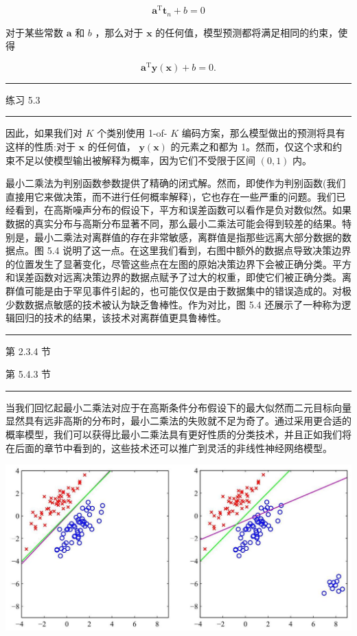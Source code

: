 \documentclass[10pt]{article}
\newcommand{\HRule}{\begin{center}\rule{0.9\linewidth}{0.2mm}\end{center}}
\begin{document}
\[
{\mathbf{a}}^{\mathrm{T}}{\mathbf{t}}_{n} + b = 0 \tag{5.17}
\]

对于某些常数 \(\mathbf{a}\) 和 \(b\) ，那么对于 \(\mathbf{x}\) 的任何值，模型预测都将满足相同的约束，使得

\[
{\mathbf{a}}^{\mathrm{T}}\mathbf{y}\left( \mathbf{x}\right)  + b = 0. \tag{5.18}
\]

\HRule

练习 5.3

\HRule

因此，如果我们对 \(K\) 个类别使用 1-of- \(K\) 编码方案，那么模型做出的预测将具有这样的性质:对于 \(\mathbf{x}\) 的任何值， \(\mathbf{y}\left( \mathbf{x}\right)\) 的元素之和都为 1。然而，仅这个求和约束不足以使模型输出被解释为概率，因为它们不受限于区间 \(\left( {0,1}\right)\) 内。

最小二乘法为判别函数参数提供了精确的闭式解。然而，即使作为判别函数(我们直接用它来做决策，而不进行任何概率解释)，它也存在一些严重的问题。我们已经看到，在高斯噪声分布的假设下，平方和误差函数可以看作是负对数似然。如果数据的真实分布与高斯分布显著不同，那么最小二乘法可能会得到较差的结果。特别是，最小二乘法对离群值的存在非常敏感，离群值是指那些远离大部分数据的数据点。图 5.4 说明了这一点。在这里我们看到，右图中额外的数据点导致决策边界的位置发生了显著变化，尽管这些点在左图的原始决策边界下会被正确分类。平方和误差函数对远离决策边界的数据点赋予了过大的权重，即使它们被正确分类。离群值可能是由于罕见事件引起的，也可能仅仅是由于数据集中的错误造成的。对极少数数据点敏感的技术被认为缺乏鲁棒性。作为对比，图 5.4 还展示了一种称为逻辑回归的技术的结果，该技术对离群值更具鲁棒性。

\HRule

第 2.3.4 节

第 5.4.3 节

\HRule

当我们回忆起最小二乘法对应于在高斯条件分布假设下的最大似然而二元目标向量显然具有远非高斯的分布时，最小二乘法的失败就不足为奇了。通过采用更合适的概率模型，我们可以获得比最小二乘法具有更好性质的分类技术，并且正如我们将在后面的章节中看到的，这些技术还可以推广到灵活的非线性神经网络模型。

\begin{center}
\includegraphics[max width=1.0\textwidth]{images/0194e279-9b28-703a-88f4-c3ac21e2010d_157_231_365_1293_621_0.jpg}
\end{center}
\hspace*{3em} 
\end{document}
